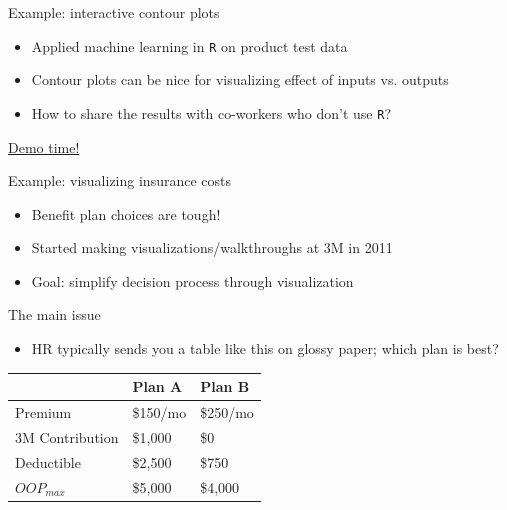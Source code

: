 \documentclass[sans,aspectratio=169,presentation,bigger,fleqn]{beamer}
\begin{document}
\begin{frame}[fragile,label=sec-9]{Example: interactive contour plots}
 \begin{itemize}
\item Applied machine learning in \texttt{R} on product test data
\item Contour plots can be nice for visualizing effect of inputs vs. outputs
\item How to share the results with co-workers who don't use \texttt{R}?
\end{itemize}

\pause

\href{http://spark.rstudio.com/jwhendy/interactive-contour/}{\alert{Demo time!}}
\end{frame}
\begin{frame}[label=sec-10]{Example: visualizing insurance costs}
\begin{itemize}
\item Benefit plan choices are tough!
\item Started making visualizations/walkthroughs at 3M in 2011
\item Goal: simplify decision process through visualization
\end{itemize}
\end{frame}
\begin{frame}[label=sec-11]{The main issue}
\begin{itemize}
\item HR typically sends you a table like this on glossy paper; which plan is best?
\end{itemize}

\begin{center}
\begin{tabular}{lll}
\toprule
 & Plan A & Plan B\\
\midrule
Premium & \$150/mo & \$250/mo\\
3M Contribution & \$1,000 & \$0\\
Deductible & \$2,500 & \$750\\
\(OOP_{max}\) & \$5,000 & \$4,000\\
\bottomrule
\end{tabular}
\end{center}
\end{frame}
\end{document}
